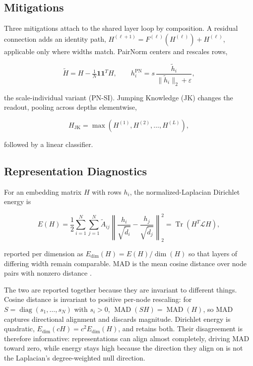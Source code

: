 \documentclass[
  conference]{IEEEtran}
\begin{document}
\subsection{Mitigations}\label{mitigations-1}

Three mitigations attach to the shared layer loop by composition. A
residual connection adds an identity path,
\(H^{(\ell+1)}=F^{(\ell)}(H^{(\ell)})+H^{(\ell)}\), applicable only
where widths match. PairNorm \citep{zhao2020pairnorm} centers and
rescales rows,

\[
\widetilde{H}=H-\tfrac{1}{N}\mathbf{1}\mathbf{1}^{T}H,
\qquad
h_i^{\mathrm{PN}}=s\,\frac{\widetilde{h}_i}{\lVert\widetilde{h}_i\rVert_2+\varepsilon},
\]

the scale-individual variant (PN-SI). Jumping Knowledge (JK)
\citep{xu2018representation} changes the readout, pooling across depths
elementwise,

\[
H_{\mathrm{JK}}=\max\!\left(H^{(1)},H^{(2)},\ldots,H^{(L)}\right),
\]

followed by a linear classifier.

\subsection{Representation
Diagnostics}\label{representation-diagnostics}

For an embedding matrix \(H\) with rows \(h_i\), the
normalized-Laplacian Dirichlet energy is

\[
E(H)=\frac{1}{2}\sum_{i=1}^{N}\sum_{j=1}^{N}\widetilde{A}_{ij}
\left\lVert \frac{h_i}{\sqrt{\widetilde{d}_i}}-\frac{h_j}{\sqrt{\widetilde{d}_j}} \right\rVert_2^2
=\operatorname{Tr}\!\left(H^{T}\mathcal{L}H\right),
\]

reported per dimension as
\(E_{\mathrm{dim}}(H)=E(H)/\operatorname{dim}(H)\) so that layers of
differing width remain comparable. MAD is the mean cosine distance over
node pairs with nonzero distance \citep{chen2020measuring}.

The two are reported together because they are invariant to different
things. Cosine distance is invariant to positive per-node rescaling: for
\(S=\operatorname{diag}(s_1,\ldots,s_N)\) with \(s_i>0\),
\(\operatorname{MAD}(SH)=\operatorname{MAD}(H)\), so MAD captures
directional alignment and discards magnitude. Dirichlet energy is
quadratic, \(E_{\mathrm{dim}}(cH)=c^2E_{\mathrm{dim}}(H)\), and retains
both. Their disagreement is therefore informative: representations can
align almost completely, driving MAD toward zero, while energy stays
high because the direction they align on is not the Laplacian's
degree-weighted null direction.
\end{document}
